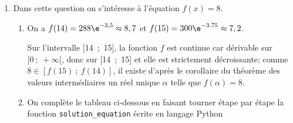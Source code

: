 \begin{enumerate}
\begin{enumerate}
	\end{enumerate}
\item Dans cette question on s'intéresse à l'équation $f(x) = 8$.
	\begin{enumerate}
		\item %
		On a $f(14) = 288\e^{-3,5} \approx 8,7$ et $f(15) = 300\e^{-3.75} \approx 7,2$.
		
Sur l'intervalle [14~;~15], la fonction $f$ est continue car dérivable sur $[0~;~+ \infty[$, donc sur [14~;~15] et elle est strictement décroissante; comme $8 \in [f(15)~;~f(14)]$, il existe d'après le corollaire du théorème des valeurs intermédiaires un réel unique $\alpha$ telle que $f(\alpha) = 8$.
		\item On complète le tableau ci-dessous en faisant tourner étape par étape la fonction \texttt{solution\_equation} écrite en langage Python


\end{enumerate}
\end{enumerate}
